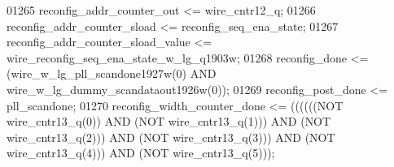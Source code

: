 \begin{DoxyCode}
{01265     \textcolor{vhdlchar}{reconfig_addr_counter_out} \textcolor{vhdlchar}{<=} \textcolor{vhdlchar}{wire_cntr12_q};
01266     \textcolor{vhdlchar}{reconfig_addr_counter_sload} \textcolor{vhdlchar}{<=} \textcolor{vhdlchar}{reconfig_seq_ena_state};
01267     \textcolor{vhdlchar}{reconfig_addr_counter_sload_value} \textcolor{vhdlchar}{<=} \textcolor{vhdlchar}{wire_reconfig_seq_ena_state_w_lg_q1903w};
01268     \textcolor{vhdlchar}{reconfig_done} \textcolor{vhdlchar}{<=} \textcolor{vhdlchar}{(}\textcolor{vhdlchar}{wire_w_lg_pll_scandone1927w}\textcolor{vhdlchar}{(}\textcolor{vhdllogic}{}\textcolor{vhdllogic}{0}\textcolor{vhdlchar}{)} \textcolor{keywordflow}{AND} \textcolor{vhdlchar}{
      wire_w_lg_dummy_scandataout1926w}\textcolor{vhdlchar}{(}\textcolor{vhdllogic}{}\textcolor{vhdllogic}{0}\textcolor{vhdlchar}{)}\textcolor{vhdlchar}{)};
01269     \textcolor{vhdlchar}{reconfig_post_done} \textcolor{vhdlchar}{<=} \textcolor{vhdlchar}{pll_scandone};
01270     \textcolor{vhdlchar}{reconfig_width_counter_done} \textcolor{vhdlchar}{<=} \textcolor{vhdlchar}{(}\textcolor{vhdlchar}{(}\textcolor{vhdlchar}{(}\textcolor{vhdlchar}{(}\textcolor{vhdlchar}{(}\textcolor{vhdlchar}{(}\textcolor{keywordflow}{NOT} \textcolor{vhdlchar}{wire_cntr13_q}\textcolor{vhdlchar}{(}\textcolor{vhdllogic}{}\textcolor{vhdllogic}{0}\textcolor{vhdlchar}{)}\textcolor{vhdlchar}{)} \textcolor{keywordflow}{AND} \textcolor{vhdlchar}{(}\textcolor{keywordflow}{NOT} \textcolor{vhdlchar}{
      wire_cntr13_q}\textcolor{vhdlchar}{(}\textcolor{vhdllogic}{}\textcolor{vhdllogic}{1}\textcolor{vhdlchar}{)}\textcolor{vhdlchar}{)}\textcolor{vhdlchar}{)} \textcolor{keywordflow}{AND} \textcolor{vhdlchar}{(}\textcolor{keywordflow}{NOT} \textcolor{vhdlchar}{wire_cntr13_q}\textcolor{vhdlchar}{(}\textcolor{vhdllogic}{}\textcolor{vhdllogic}{2}\textcolor{vhdlchar}{)}\textcolor{vhdlchar}{)}\textcolor{vhdlchar}{)} \textcolor{keywordflow}{AND} \textcolor{vhdlchar}{(}\textcolor{keywordflow}{NOT} \textcolor{vhdlchar}{wire_cntr13_q}\textcolor{vhdlchar}{(}\textcolor{vhdllogic}{}\textcolor{vhdllogic}{3}\textcolor{vhdlchar}{)}\textcolor{vhdlchar}{)}\textcolor{vhdlchar}{)} \textcolor{keywordflow}{AND} \textcolor{vhdlchar}{(}\textcolor{keywordflow}{NOT} \textcolor{vhdlchar}{
      wire_cntr13_q}\textcolor{vhdlchar}{(}\textcolor{vhdllogic}{}\textcolor{vhdllogic}{4}\textcolor{vhdlchar}{)}\textcolor{vhdlchar}{)}\textcolor{vhdlchar}{)} \textcolor{keywordflow}{AND} \textcolor{vhdlchar}{(}\textcolor{keywordflow}{NOT} \textcolor{vhdlchar}{wire_cntr13_q}\textcolor{vhdlchar}{(}\textcolor{vhdllogic}{}\textcolor{vhdllogic}{5}\textcolor{vhdlchar}{)}\textcolor{vhdlchar}{)}\textcolor{vhdlchar}{)};
}
\end{DoxyCode}
